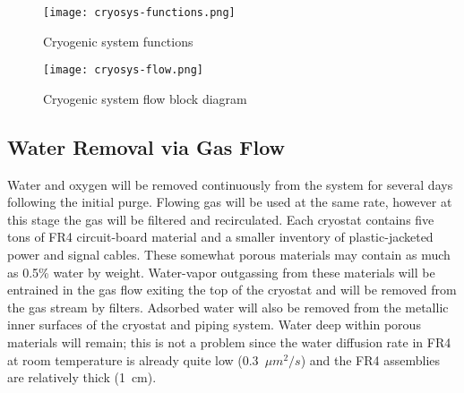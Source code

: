 \begin{figure}[htbp]
\centering
\texttt{[image: cryosys-functions.png]} 
\caption{Cryogenic system functions}
\label{fig:v5ch2-LBNF-block-diagram-2014}
\end{figure}

\begin{figure}[htbp]
\centering
\texttt{[image: cryosys-flow.png]} 
\caption{Cryogenic system flow block diagram}
\label{fig:v5ch2-LBNF-cryo-process-2014}
\end{figure}



\subsection{Water Removal via Gas Flow}

Water and oxygen will be removed continuously from the system for several days following the
initial purge. Flowing gas will be used at the same rate, however at this stage the gas will
be filtered and recirculated. Each cryostat contains five tons of FR4
circuit-board material and a
smaller inventory of plastic-jacketed power and signal cables. These somewhat porous
materials may contain as much as 0.5\% water by weight. Water-vapor outgassing from these
materials will be entrained in the gas flow exiting
the top of the cryostat and will be removed
from the gas stream by filters. Adsorbed water will also be removed from the metallic inner
surfaces of the cryostat and piping system. Water deep within porous materials will remain;
this is not a problem since
the water diffusion rate in FR4 at room temperature is already 
quite low (0.3~$\mu m^2 /s$) and the FR4 assemblies are relatively thick (1~cm).



